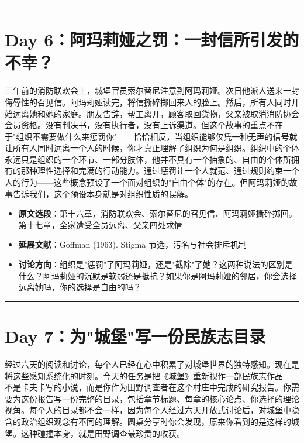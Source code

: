 \documentclass[11pt, a4paper]{ctexart}
\newcommand{\daysep}{\vspace{0.5em}\noindent\rule{\textwidth}{0.2pt}\vspace{0.8em}}
\begin{document}
\daysep

\section*{Day 6：阿玛莉娅之罚：一封信所引发的不幸？}

三年前的消防联欢会上，城堡官员索尔替尼注意到阿玛莉娅。次日他派人送来一封侮辱性的召见信。阿玛莉娅读完，将信撕碎掷回来人的脸上。然后，所有人同时开始远离她和她的家庭。朋友告辞，帮工离开，顾客取回货物，父亲被取消消防协会会员资格。没有判决书，没有执行者，没有上诉渠道。但这个故事的重点不在于"组织不需要做什么来惩罚你"——恰恰相反，当组织能够仅凭一种无声的信号就让所有人同时远离一个人的时候，你才真正理解了组织为何是组织。组织中的个体永远只是组织的一个环节、一部分肢体，他并不具有一个抽象的、自由的个体所拥有的那种理性选择和完满的行动能力。通过惩罚让一个人就范、通过规则约束一个人的行为——这些概念预设了一个面对组织的"自由个体"的存在。但阿玛莉娅的故事告诉我们，这个预设本身就是对组织性质的误解。

\vspace{0.5em}

\begin{itemize}
  \item \textbf{原文选段}：第十六章，消防联欢会、索尔替尼的召见信、阿玛莉娅撕碎掷回。第十七章，全家遭受全员远离、父亲四处求情
  \item \textbf{延展文献}：Goffman (1963). Stigma 节选，污名与社会排斥机制
  \item \textbf{讨论方向}：组织是"惩罚"了阿玛莉娅，还是"截除"了她？这两种说法的区别是什么？阿玛莉娅的沉默是软弱还是抵抗？如果你是阿玛莉娅的邻居，你会选择远离她吗，你的选择是自由的吗？
\end{itemize}

\daysep

\section*{Day 7：为"城堡"写一份民族志目录}

经过六天的阅读和讨论，每个人已经在心中积累了对城堡世界的独特感知。现在是将这些感知系统化的时刻。今天的任务是把《城堡》重新视作一部民族志作品——不是卡夫卡写的小说，而是你作为田野调查者在这个村庄中完成的研究报告。你需要为这份报告写一份完整的目录，包括章节标题、每章的核心论点、你选择的理论视角。每个人的目录都不会一样，因为每个人经过六天开放式讨论后，对城堡中隐含的政治组织观念有不同的理解。圆桌分享时你会发现，原来你看到的是这样的城堡。这种碰撞本身，就是田野调查最珍贵的收获。

\vspace{0.5em}
\end{document}
